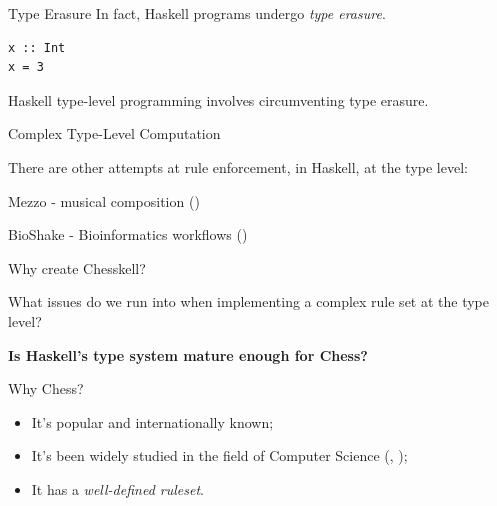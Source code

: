 \documentclass{beamer}
\begin{document}
\begin{frame}[fragile]{Type Erasure}
In fact, Haskell programs undergo \emph{type erasure}.

\pause

\begin{lstlisting}
x :: Int
x = 3
\end{lstlisting}

Haskell type-level programming involves circumventing type erasure.

\end{frame}

\begin{frame}{Complex Type-Level Computation}

There are other attempts at rule enforcement, in Haskell, at the type level:

\pause

Mezzo - musical composition (\cite{mezzohaskellsymposium})

\pause

BioShake - Bioinformatics workflows (\cite{bioshake})




    
\end{frame}

\begin{frame}[fragile]{Why create Chesskell?}

What issues do we run into when implementing a complex rule set at the type level?

\pause

\textbf{Is Haskell's type system mature enough for Chess?}

\end{frame}

\begin{frame}{Why Chess?}

\begin{itemize}
    \item<1-3> It's popular and internationally known;
    \item<2-3> It's been widely studied in the field of Computer Science (\cite{chesseducation}, \cite{chessml});
    \item<3-4> It has a \emph{well-defined ruleset}.
\end{itemize}
    
\end{frame}
\end{document}
